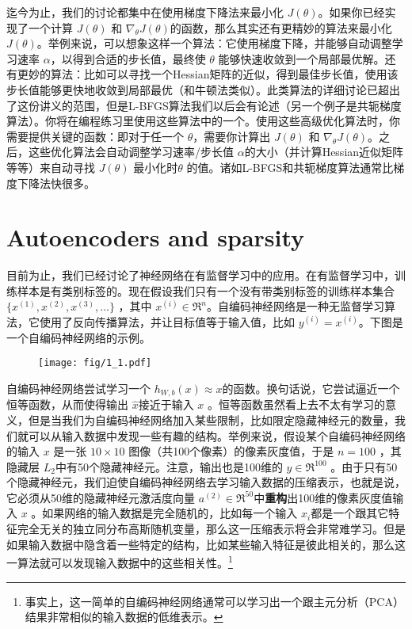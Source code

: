 迄今为止，我们的讨论都集中在使用梯度下降法来最小化 $ J(\theta)$。如果你已经实现了一个计算 $ J(\theta)$ 和 $ \nabla_\theta J(\theta) $的函数，那么其实还有更精妙的算法来最小化 $ J(\theta)$。举例来说，可以想象这样一个算法：它使用梯度下降，并能够自动调整学习速率 $ \alpha$，以得到合适的步长值，最终使 $ \theta$ 能够快速收敛到一个局部最优解。还有更妙的算法：比如可以寻找一个Hessian矩阵的近似，得到最佳步长值，使用该步长值能够更快地收敛到局部最优（和牛顿法类似）。此类算法的详细讨论已超出了这份讲义的范围，但是L-BFGS算法我们以后会有论述（另一个例子是共轭梯度算法）。你将在编程练习里使用这些算法中的一个。使用这些高级优化算法时，你需要提供关键的函数：即对于任一个 $ \theta$，需要你计算出 $ J(\theta)$ 和 $ \nabla_\theta J(\theta)$。之后，这些优化算法会自动调整学习速率/步长值  $ \alpha $的大小（并计算Hessian近似矩阵等等）来自动寻找 $ J(\theta)$ 最小化时$ \theta$ 的值。诸如L-BFGS和共轭梯度算法通常比梯度下降法快很多。
\section{Autoencoders and sparsity}
目前为止，我们已经讨论了神经网络在有监督学习中的应用。在有监督学习中，训练样本是有类别标签的。现在假设我们只有一个没有带类别标签的训练样本集合 $\{x^{(1)}, x^{(2)}, x^{(3)}, \ldots\}$ ，其中 $x^{(i)} \in \Re^{n} $。自编码神经网络是一种无监督学习算法，它使用了反向传播算法，并让目标值等于输入值，比如 $ y^{(i)} = x^{(i)} $。下图是一个自编码神经网络的示例。

\begin{figure}[H]
\centering
\texttt{[image: fig/1\_1.pdf]}
\end{figure}

自编码神经网络尝试学习一个 $ h_{W,b}(x) \approx x $的函数。换句话说，它尝试逼近一个恒等函数，从而使得输出 $ \hat{x} $接近于输入 $ x$ 。恒等函数虽然看上去不太有学习的意义，但是当我们为自编码神经网络加入某些限制，比如限定隐藏神经元的数量，我们就可以从输入数据中发现一些有趣的结构。举例来说，假设某个自编码神经网络的输入 $ x $ 是一张 $ 10 \times 10$ 图像（共100个像素）的像素灰度值，于是 $ n=100$ ，其隐藏层 $ L_2 $中有50个隐藏神经元。注意，输出也是100维的 $ y \in \Re^{100}$ 。由于只有50个隐藏神经元，我们迫使自编码神经网络去学习输入数据的压缩表示，也就是说，它必须从50维的隐藏神经元激活度向量 $ a^{(2)} \in \Re^{50} $中\textbf{重构}出100维的像素灰度值输入 $ x$ 。如果网络的输入数据是完全随机的，比如每一个输入 $ x_i $都是一个跟其它特征完全无关的独立同分布高斯随机变量，那么这一压缩表示将会非常难学习。但是如果输入数据中隐含着一些特定的结构，比如某些输入特征是彼此相关的，那么这一算法就可以发现输入数据中的这些相关性。\footnote{事实上，这一简单的自编码神经网络通常可以学习出一个跟主元分析（PCA）结果非常相似的输入数据的低维表示。}

